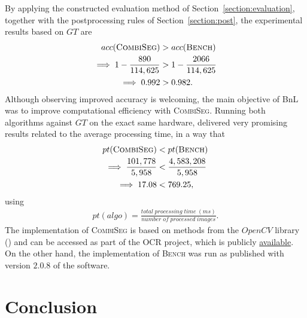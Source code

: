 \documentclass{jdmdh}
\begin{document}
By applying the constructed evaluation method of Section~\ref{section:evaluation}, together with the postprocessing rules of Section~\ref{section:post}, the experimental results based on $GT$ are
\begin{align}
    acc(\textsc{CombiSeg})&>acc(\textsc{Bench}) \nonumber \\
    \implies1-\frac{890}{114,625}&>1-\frac{2066}{114,625} \nonumber \\
    \implies0.992&>0.982.
\end{align}
Although observing improved accuracy is welcoming, the main objective of BnL was to improve computational efficiency with \textsc{CombiSeg}. Running both algorithms against $GT$ on the exact same hardware, delivered very promising results related to the average processing time, in a way that
\begin{align}
    pt(\textsc{CombiSeg}) &< pt(\textsc{Bench}) \nonumber \\
    \implies\frac{101,778}{5,958}&<\frac{4,583,208}{5,958} \nonumber \\
    \implies17.08&<769.25,
\end{align}
using
\begin{align}
    pt(algo)=\frac{total\;processing\;time\;(ms)}{number\;of\;processed\;images}.
\end{align}
The implementation of \textsc{CombiSeg} is based on methods from the $OpenCV$ library (\citet{opencv}) and can be accessed as part of the OCR project, which is publicly \href{https://github.com/natliblux/nautilusocr}{available}. On the other hand, the implementation of \textsc{Bench} was run as published with version $2.0.8$ of the software.
\section{Conclusion}
\end{document}
